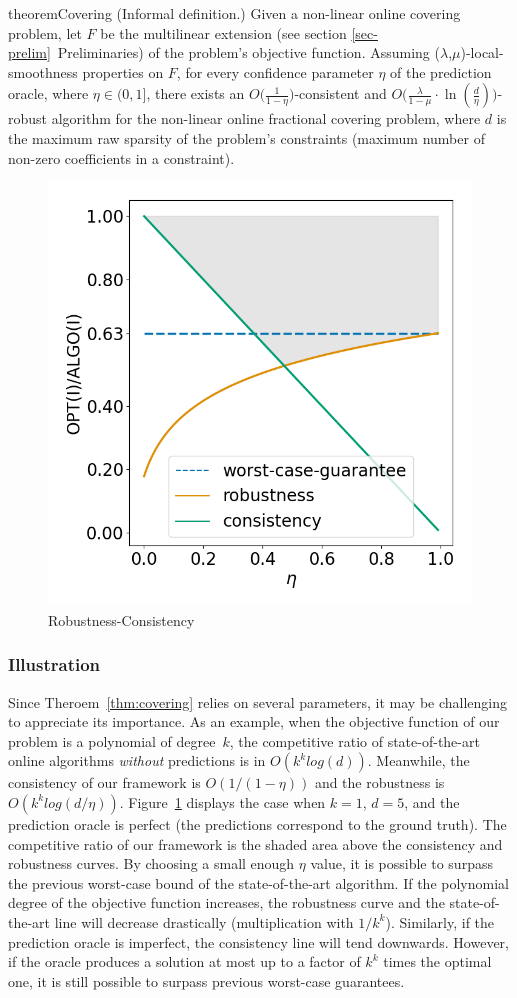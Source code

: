 \begin{restatable}{theorem}{Covering}
\label{thm:covering}
(Informal definition.) Given a non-linear online covering problem, let $F$ be the multilinear extension (see section \ref{sec-prelim}~Preliminaries) of the problem's objective function. Assuming ($\lambda$,$\mu$)-local-smoothness properties on $F$, for every confidence parameter $\eta$ of the prediction oracle, where $\eta \in (0,1]$, there exists an $O\bigl( \frac{1}{1 - \eta} \bigr)$-consistent and
$O\bigl( \frac{\lambda}{1 - \mu}  \cdot \ln \left(\frac{d}{\eta}\right) \bigr)$-robust algorithm for the non-linear online fractional covering problem, where $d$ is the maximum raw sparsity of the problem's constraints (maximum number of non-zero coefficients in a constraint).
\end{restatable}

\begin{figure}
    \centering
    \includegraphics[width=0.5\linewidth]{../../01_covering_multiple_experts/paper/Img/consistency_robustness.png}
    \caption{Robustness-Consistency}
    \label{fig:worst-case}
\end{figure}

\subsubsection{Illustration} Since Theroem~\ref{thm:covering} relies on several parameters, it may be challenging to appreciate its importance. As an example, when the objective function of our problem is a polynomial of degree~$k$, the competitive ratio of state-of-the-art online algorithms \emph{without} predictions is in $O(k^k log(d))$. Meanwhile, the consistency of our framework is $O(1 / (1-\eta))$ and the robustness is $O(k^k log(d/\eta))$. Figure~\ref{fig:worst-case} displays the case when $k = 1$, $d=5$, and the prediction oracle is perfect (the predictions correspond to the ground truth). The competitive ratio of our framework is the shaded area above the consistency and robustness curves. By choosing a small enough $\eta$ value, it is possible to surpass the previous worst-case bound of the state-of-the-art algorithm. If the polynomial degree of the objective function increases, the robustness curve and the state-of-the-art line will decrease drastically (multiplication with $1/k^k$). Similarly, if the prediction oracle is imperfect, the consistency line will tend downwards. However, if the oracle produces a solution at most up to a factor of $k^k$ times the optimal one, it is still possible to surpass previous worst-case guarantees.


